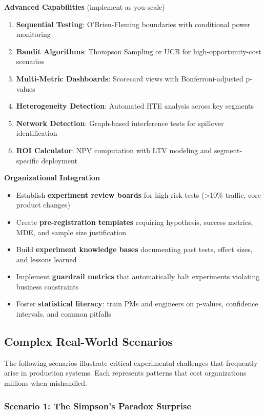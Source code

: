 \textbf{Advanced Capabilities} (implement as you scale)
\begin{enumerate}
    \item \textbf{Sequential Testing}: O'Brien-Fleming boundaries with conditional power monitoring
    \item \textbf{Bandit Algorithms}: Thompson Sampling or UCB for high-opportunity-cost scenarios
    \item \textbf{Multi-Metric Dashboards}: Scorecard views with Bonferroni-adjusted p-values
    \item \textbf{Heterogeneity Detection}: Automated HTE analysis across key segments
    \item \textbf{Network Detection}: Graph-based interference tests for spillover identification
    \item \textbf{ROI Calculator}: NPV computation with LTV modeling and segment-specific deployment
\end{enumerate}

\textbf{Organizational Integration}
\begin{itemize}
    \item Establish \textbf{experiment review boards} for high-risk tests (>10\% traffic, core product changes)
    \item Create \textbf{pre-registration templates} requiring hypothesis, success metrics, MDE, and sample size justification
    \item Build \textbf{experiment knowledge bases} documenting past tests, effect sizes, and lessons learned
    \item Implement \textbf{guardrail metrics} that automatically halt experiments violating business constraints
    \item Foster \textbf{statistical literacy}: train PMs and engineers on p-values, confidence intervals, and common pitfalls
\end{itemize}

\subsection{Complex Real-World Scenarios}

The following scenarios illustrate critical experimental challenges that frequently arise in production systems. Each represents patterns that cost organizations millions when mishandled.

\subsubsection{Scenario 1: The Simpson's Paradox Surprise}

